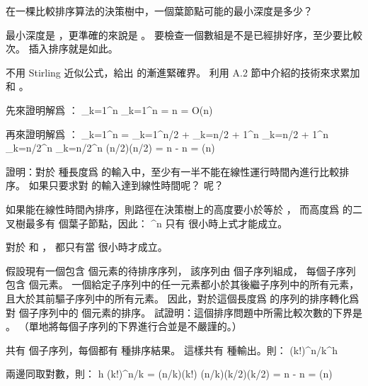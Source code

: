 \startsection[
  title={Lower bounds for sorting},
  reference=section:lower_bound_sorting,
]

\startEXERCISE
在一棵比較排序算法的決策樹中，一個葉節點可能的最小深度是多少？
\stopEXERCISE

\startANSWER
最小深度是 ，更準確的來說是 。
要檢查一個數組是不是已經排好序，至少要比較  次。
插入排序就是如此。
\stopANSWER

不用 Stirling 近似公式，給出  的漸進緊確界。
利用 A.2 節中介紹的技術來求累加和 。
\stopEXERCISE

\startANSWER
先來證明解爲 ：
\startformula
\sum_{k=1}^n \le \sum_{k=1}^n = n = O(n)
\stopformula

再來證明解爲 ：
\startformula\startmathalignment
\NC \sum_{k=1}^n
   \NC= \sum_{k=1}^{\lfloor n/2 \rfloor} +
	\sum_{k=\lfloor n/2 \rfloor + 1}^n \NR
\NC\NC\ge \sum_{k=\lfloor n/2 \rfloor + 1}^n \NR
\NC\NC\ge \sum_{k=n/2}^n \NR
\NC\NC\ge \sum_{k=n/2}^n \NR
\NC\NC\ge (n/2)\lg(n/2) \NR
\NC\NC= n - n \NR
\NC\NC= \Omega(n) \NR
\stopmathalignment\stopformula
\stopANSWER

\startEXERCISE
證明：對於  種長度爲  的輸入中，至少有一半不能在線性運行時間內進行比較排序。
如果只要求對  的輸入達到線性時間呢？  呢？
\stopEXERCISE

\startANSWER
如果能在線性時間內排序，則路徑在決策樹上的高度要小於等於 ，
而高度爲  的二叉樹最多有  個葉子節點，因此：
\startformula
{} ^n
\stopformula
只有  很小時上式才能成立。

對於  和 ，
都只有當  很小時才成立。
\stopANSWER

\startEXERCISE
假設現有一個包含  個元素的待排序序列，
該序列由  個子序列組成，
每個子序列包含  個元素。
一個給定子序列中的任一元素都小於其後繼子序列中的所有元素，
且大於其前驅子序列中的所有元素。
因此，對於這個長度爲  的序列的排序轉化爲對  個子序列中的  個元素的排序。
試證明：這個排序問題中所需比較次數的下界是 。
（\hint 單地將每個子序列的下界進行合並是不嚴謹的。）
\stopEXERCISE

\startANSWER
共有  個子序列，每個都有  種排序結果。
這樣共有  種輸出。則：
\startformula
(k!)^{n/k}^h
\stopformula

兩邊同取對數，則：
\startformula\startmathalignment
\NC h
   \NC\ge \lg(k!)^{n/k} \NR
\NC\NC=   (n/k)\lg(k!) \NR
\NC\NC\ge (n/k)(k/2)\lg(k/2) \qquad {}\NR
\NC\NC=   n - n \NR
\NC\NC=   \Omega(n) \NR
\stopmathalignment\stopformula
\stopANSWER

\stopsection
